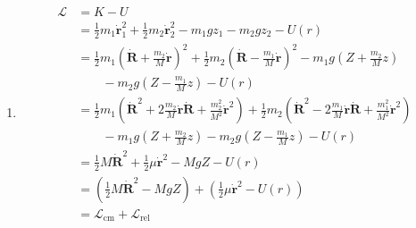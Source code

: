 \documentclass{article}
\renewcommand{\vec}[1]{\boldsymbol{\mathbf{#1}}}
\newcommand{\dvec}[1]{\dot{\vec{#1}}}
\begin{document}
\begin{enumerate}
  \item

        \begin{align*}
          \mathcal{L} & = K - U                                                                                                                                                                                                                       \\
                      & = \frac{1}{2} m_1 \dvec{r}_1^2 + \frac{1}{2} m_2 \dvec{r}_2^2 - m_1 g z_1 - m_2 g z_2 - U(r)                                                                                                                                  \\
                      & = \frac{1}{2} m_1 \left( \dvec{R} + \frac{m_2}{M} \dvec{r} \right)^2 + \frac{1}{2} m_2 \left( \dvec{R} - \frac{m_1}{M} \dvec{r} \right)^2 - m_1 g \left( Z + \frac{m_2}{M} z \right)                                          \\
                      & \qquad - m_2 g \left( Z - \frac{m_1}{M} z \right) - U(r)                                                                                                                                                                      \\
                      & = \frac{1}{2} m_1 \left( \dvec{R}^2 + 2 \frac{m_2}{M} \dvec{r} \dvec{R} + \frac{m_2^2}{M^2} \dvec{r}^2 \right) + \frac{1}{2} m_2 \left( \dvec{R}^2 - 2 \frac{m_1}{M} \dvec{r} \dvec{R} + \frac{m_1^2}{M^2} \dvec{r}^2 \right) \\
                      & \qquad - m_1 g \left( Z + \frac{m_2}{M} z \right) - m_2 g \left( Z - \frac{m_1}{M} z \right) - U(r)                                                                                                                           \\
                      & = \frac{1}{2} M \dvec{R}^2 + \frac{1}{2} \mu \dvec{r}^2 - M g Z - U(r)                                                                                                                                                        \\
                      & = \left( \frac{1}{2} M \dvec{R}^2 - M g Z \right) + \left( \frac{1}{2} \mu \dvec{r}^2 - U(r) \right)                                                                                                                          \\
                      & = \mathcal{L}_\text{cm} + \mathcal{L}_\text{rel}
        \end{align*}
\end{enumerate}
\end{document}

